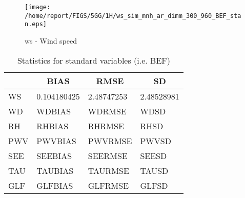 \documentclass[11pt,english]{article}
\begin{document}
\begin{figure}[htbp]
\centering
{\texttt{[image: /home/report/FIGS/5GG/1H/ws\_sim\_mnh\_ar\_dimm\_300\_960\_BEF\_stan.eps]}}
\caption{ws - Wind speed}\label{fig:ws2}
\end{figure}
\newpage
\begin{table}[]
\begin{center}
\begin{tabular}{|l|l|l|l|}
\hline
                            & \multicolumn{1}{c|}{\cellcolor[HTML]{C0C0C0}\textbf{BIAS}} & \multicolumn{1}{c|}{\cellcolor[HTML]{C0C0C0}\textbf{RMSE}} & \multicolumn{1}{c|}{\cellcolor[HTML]{C0C0C0}\textbf{SD}} \\\hline
\cellcolor[HTML]{C0C0C0}WS  &   0.104180425                                    &    2.48747253                                    &    2.48528981                                    \\
\cellcolor[HTML]{C0C0C0}WD  & WDBIAS                                & WDRMSE                                & WDSD                                \\
\cellcolor[HTML]{C0C0C0}RH  & RHBIAS                                & RHRMSE                                & RHSD                                \\
\cellcolor[HTML]{C0C0C0}PWV & PWVBIAS                               & PWVRMSE                               & PWVSD                               \\
\cellcolor[HTML]{C0C0C0}SEE & SEEBIAS                               & SEERMSE                               & SEESD                               \\
\cellcolor[HTML]{C0C0C0}TAU & TAUBIAS                               & TAURMSE                               & TAUSD                               \\
\cellcolor[HTML]{C0C0C0}GLF & GLFBIAS                               & GLFRMSE                               & GLFSD                               \\
\hline
\end{tabular}
\caption{Statistics for standard variables (i.e. BEF)}
\end{center}
\end{table}
\clearpage
\end{document}
